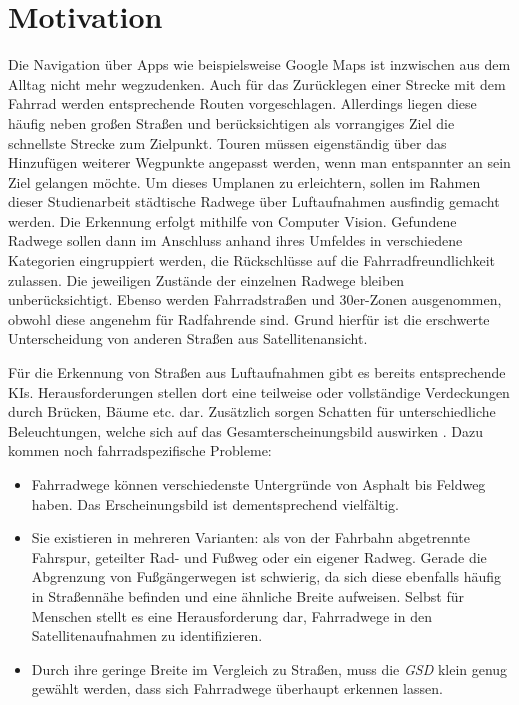 \chapter{Motivation}

Die Navigation über Apps wie beispielsweise Google Maps ist inzwischen aus dem Alltag nicht mehr wegzudenken.
Auch für das Zurücklegen einer Strecke mit dem Fahrrad werden entsprechende Routen vorgeschlagen.
Allerdings liegen diese häufig neben großen Straßen und berücksichtigen als vorrangiges Ziel die schnellste Strecke zum Zielpunkt.
Touren müssen eigenständig über das Hinzufügen weiterer Wegpunkte angepasst werden, wenn man entspannter an sein Ziel gelangen möchte.
Um dieses Umplanen zu erleichtern, sollen im Rahmen dieser Studienarbeit städtische Radwege über Luftaufnahmen ausfindig gemacht werden.
Die Erkennung erfolgt mithilfe von Computer Vision.
Gefundene Radwege sollen dann im Anschluss anhand ihres Umfeldes in verschiedene Kategorien eingruppiert werden, die Rückschlüsse auf die Fahrradfreundlichkeit zulassen.
Die jeweiligen Zustände der einzelnen Radwege bleiben unberücksichtigt.
Ebenso werden Fahrradstraßen und 30er-Zonen ausgenommen, obwohl diese angenehm für Radfahrende sind.
Grund hierfür ist die erschwerte Unterscheidung von anderen Straßen aus Satellitenansicht.

Für die Erkennung von Straßen aus Luftaufnahmen gibt es bereits entsprechende KIs.
Herausforderungen stellen dort eine teilweise oder vollständige Verdeckungen durch Brücken, Bäume etc. dar.
Zusätzlich sorgen Schatten für unterschiedliche Beleuchtungen, welche sich auf das Gesamterscheinungsbild auswirken \cite{Azimi.2018}.
Dazu kommen noch fahrradspezifische Probleme:

\begin{itemize}
	\item Fahrradwege können verschiedenste Untergründe von Asphalt bis Feldweg haben.
			Das Erscheinungsbild ist dementsprechend vielfältig.
	\item Sie existieren in mehreren Varianten: als von der Fahrbahn abgetrennte Fahrspur, geteilter Rad- und Fußweg oder ein eigener Radweg.
			Gerade die Abgrenzung von Fußgängerwegen ist schwierig, da sich diese ebenfalls häufig in Straßennähe befinden und eine ähnliche Breite aufweisen.
			Selbst für Menschen stellt es eine Herausforderung dar, Fahrradwege in den Satellitenaufnahmen zu identifizieren.
	\item Durch ihre geringe Breite im Vergleich zu Straßen, muss die \textit{\ac{GSD}} klein genug gewählt werden, dass sich Fahrradwege überhaupt erkennen lassen.
\end{itemize}

